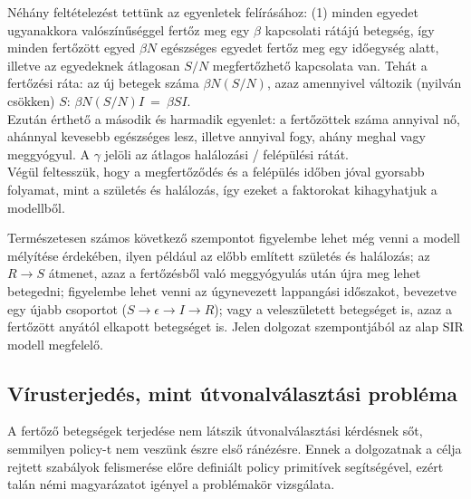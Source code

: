     Néhány feltételezést tettünk az egyenletek felírásához: (1) minden egyedet ugyanakkora valószínűséggel fertőz meg egy $\beta$ kapcsolati rátájú betegség, így minden fertőzött egyed $\beta N$ egészséges egyedet fertőz meg egy időegység alatt, illetve az egyedeknek átlagosan $S/N$ megfertőzhető kapcsolata van. Tehát a fertőzési ráta: az új betegek száma $\beta N (S/N)$, azaz amennyivel változik (nyilván csökken) $S$: $\beta N (S/N)I~=~\beta SI$.\\
    Ezután érthető a második és harmadik egyenlet: a fertőzöttek száma annyival nő, ahánnyal kevesebb egészséges lesz, illetve annyival fogy, ahány meghal vagy meggyógyul. A $\gamma$ jelöli az átlagos halálozási / felépülési rátát.\\
    Végül feltesszük, hogy a megfertőződés és a felépülés időben jóval gyorsabb folyamat, mint a születés és halálozás, így ezeket a faktorokat kihagyhatjuk a modellből.

    \begin{note}
      Természetesen számos következő szempontot figyelembe lehet még venni a modell mélyítése érdekében, ilyen például az előbb említett születés és halálozás; az $R \rightarrow S$ átmenet, azaz a fertőzésből való meggyógyulás után újra meg lehet betegedni; figyelembe lehet venni az úgynevezett lappangási időszakot, bevezetve egy újabb csoportot ($S \rightarrow \epsilon \rightarrow I \rightarrow R$); vagy a veleszületett betegséget is, azaz a fertőzött anyától elkapott betegséget is.\newline
      Jelen dolgozat szempontjából az alap SIR modell megfelelő.
    \end{note}

    \subsection{Vírusterjedés, mint útvonalválasztási probléma}
    A fertőző betegségek terjedése nem látszik útvonalválasztási kérdésnek sőt, semmilyen policy-t nem veszünk észre első ránézésre. Ennek a dolgozatnak a célja rejtett szabályok felismerése előre definiált policy primitívek segítségével, ezért talán némi magyarázatot igényel a problémakör vizsgálata.\\

